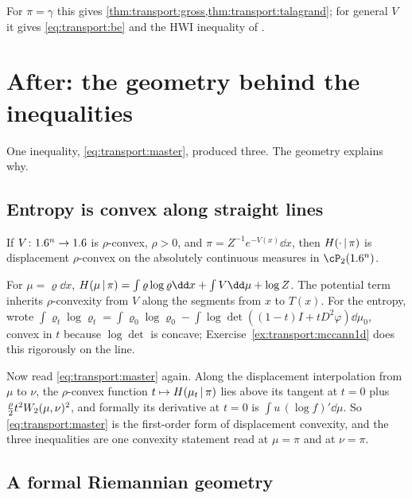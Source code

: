 \begin{refsection}
For $\pi=\gamma$ this gives \cref{thm:transport:gross,thm:transport:talagrand}; for general $V$ it gives \eqref{eq:transport:be} and the HWI inequality of \textcite{OttoVillani2000}.

\section{After: the geometry behind the inequalities}\label{sec:transport:after2}

One inequality, \eqref{eq:transport:master}, produced three. The geometry explains why.

\subsection{Entropy is convex along straight lines}\label{sec:transport:dispconvex}

\begin{theorem}\label{thm:transport:dispconvex}
If $V\colon1.6^n\to1.6$ is $\rho$-convex, $\rho>0$, and $\pi=Z^{-1}e^{-V(x)}\dd x$, then $H(\cdot\,|\,\pi)$ is displacement $\rho$-convex on the absolutely continuous measures in $\cP_2(\R^n)$.
\end{theorem}

\begin{proofsketch}
For $\mu=\varrho\dd x$, $\transportH{\mu}{\pi}=\int\varrho\log\varrho\dd x+\int V\dd\mu+\log Z$. The potential term inherits $\rho$-convexity from $V$ along the segments from $x$ to $T(x)$. For the entropy, \textcite{McCann1997} wrote $\int\varrho_t\log\varrho_t=\int\varrho_0\log\varrho_0-\int\log\det((1-t)I+tD^2\varphi)\dd\mu_0$, convex in $t$ because $\log\det$ is concave; Exercise~\ref{ex:transport:mccann1d} does this rigorously on the line.
\end{proofsketch}

Now read \eqref{eq:transport:master} again. Along the displacement interpolation from $\mu$ to $\nu$, the $\rho$-convex function $t\mapsto H(\mu_t\,|\,\pi)$ lies above its tangent at $t=0$ plus $\frac{\rho}{2}t^2W_2(\mu,\nu)^2$, and formally its derivative at $t=0$ is $\int u\,(\log f)'\dd\mu$. So \eqref{eq:transport:master} is the first-order form of displacement convexity, and the three inequalities are one convexity statement read at $\mu=\pi$ and at $\nu=\pi$.

\subsection{A formal Riemannian geometry}\label{sec:transport:otto}


\end{refsection}
